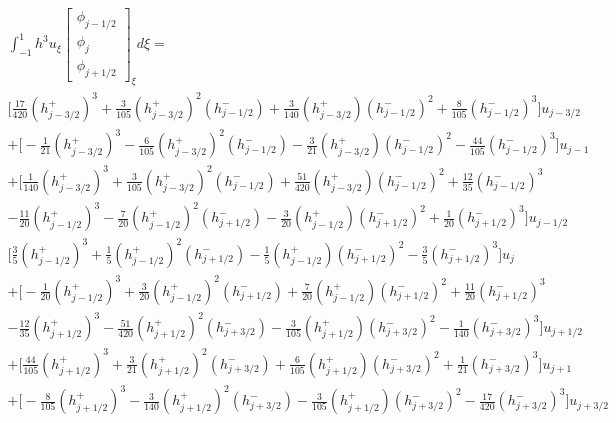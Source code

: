 \documentclass[12pt]{article}
\begin{document}
\begin{multline*}
\int_{-1}^{1}h^3u_{\xi}\left[\begin{array}{c}\phi_{j-1/2} \\\phi_{j}\\\phi_{j+1/2} \end{array}\right]_\xi d\xi = \\
\bigg[\frac{17}{420}\left(h^+_{j - 3/2}\right)^3 +  \frac{3}{105} \left(h^+_{j - 3/2}\right)^2 \left(h^-_{j - 1/2}\right)
+ \frac{3}{140} \left(h^+_{j - 3/2}\right) \left(h^-_{j - 1/2}\right)^2 +  \frac{8}{105}\left(h^-_{j - 1/2}\right)^3  \bigg] u_{j - 3/2} \\
+ \bigg[-\frac{1}{21}\left(h^+_{j - 3/2}\right)^3 - \frac{6}{105} \left(h^+_{j - 3/2}\right)^2 \left(h^-_{j - 1/2}\right)
-  \frac{3}{21} \left(h^+_{j - 3/2}\right) \left(h^-_{j - 1/2}\right)^2 - \frac{44}{105}  \left(h^-_{j - 1/2}\right)^3 \bigg] u_{j - 1} \\
+ \bigg[\frac{1}{140}\left(h^+_{j - 3/2}\right)^3 +  \frac{3}{105} \left(h^+_{j - 3/2}\right)^2 \left(h^-_{j - 1/2}\right)
+  \frac{51}{420} \left(h^+_{j - 3/2}\right) \left(h^-_{j - 1/2}\right)^2 +  \frac{12}{35} \left(h^-_{j - 1/2}\right)^3 \\ - \frac{11}{20} \left(h^+_{j - 1/2}  \right)^3  - \frac{7}{20}  \left(h^+_{j - 1/2} \right)^2\left(h^-_{j + 1/2}\right) - \frac{3}{20} \left(h^+_{j - 1/2} \right)\left(h^-_{j + 1/2}\right)^2 + \frac{1}{20} \left(h^-_{j + 1/2}\right)^3 \bigg] u_{j - 1/2} \\ 
\bigg[\frac{3}{5}\left(h^+_{j - 1/2} \right)^3 +  \frac{1}{5}\left(h^+_{j - 1/2} \right)^2\left(h^-_{j + 1/2}\right) -  \frac{1}{5} \left(h^+_{j - 1/2} \right)\left(h^-_{j + 1/2}\right)^2 - \frac{3}{5}\left(h^-_{j + 1/2}\right)^3 \bigg] u_{j}\\
+\bigg[ - \frac{1}{20}\left(h^+_{j - 1/2} \right)^3 + \frac{3}{20}  \left(h^+_{j - 1/2} \right)^2\left(h^-_{j + 1/2}\right) + \frac{7}{20} \left(h^+_{j - 1/2} \right)\left(h^-_{j + 1/2}\right)^2  + \frac{11}{20} \left(h^-_{j + 1/2}\right)^3 \\- \frac{12}{35} \left(h^+_{j + 1/2} \right)^3  - \frac{51}{420}  \left(h^+_{j + 1/2} \right)^2\left(h^-_{j + 3/2}\right)   - \frac{3}{105}\left(h^+_{j + 1/2} \right)\left(h^-_{j + 3/2}\right)^2  - \frac{1}{140}\left(h^-_{j + 3/2}\right)^3 \bigg] u_{j + 1/2} \\
+\bigg[\frac{44}{105}\left(h^+_{j + 1/2} \right)^3 + \frac{3}{21} \left(h^+_{j + 1/2} \right)^2\left(h^-_{j + 3/2}\right) + \frac{6}{105} \left(h^+_{j + 1/2} \right)\left(h^-_{j + 3/2}\right)^2 + \frac{1}{21}\left(h^-_{j + 3/2}\right)^3 \bigg] u_{j +1} \\
+ \bigg[- \frac{8}{105}\left(h^+_{j + 1/2} \right)^3 - \frac{3}{140} \left(h^+_{j + 1/2} \right)^2\left(h^-_{j + 3/2}\right) - \frac{3}{105} \left(h^+_{j + 1/2} \right)\left(h^-_{j + 3/2}\right)^2 - \frac{17}{420} \left(h^-_{j + 3/2}\right)^3 \bigg] u_{j + 3/2} 
\end{multline*}
\end{document}
